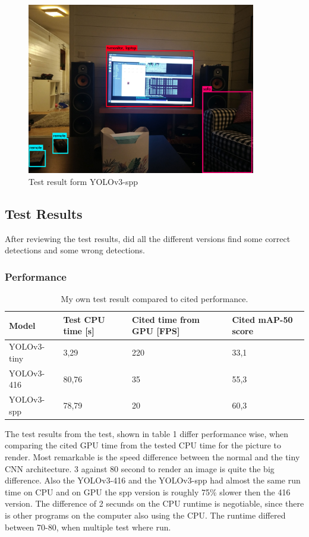 \begin{figure}
    \centering
        \includegraphics[width=10cm]{experiment_files/yolov3-spp.jpg}
    \caption{Test result form YOLOv3-spp}
    \label{fig:YOLOv3_spp}
\end{figure}

\subsection{Test Results}
After reviewing the test results, did all the different versions find some correct detections and some wrong detections.

\subsubsection*{Performance}
\begin{table}[]
\begin{tabular}{l|lll}
Model       & Test CPU time {[}s{]} & Cited time from GPU {[}FPS{]} & Cited mAP-50 score \cite{yolo_res} \\ \hline
YOLOv3-tiny & 3,29                  & 220                           & 33,1               \\
YOLOv3-416  & 80,76                 & 35                            & 55,3               \\
YOLOv3-spp  & 78,79                 & 20                            & 60,3              
\end{tabular}
\caption{My own test result compared to cited performance.}
\end{table}

The test results from the test, shown in table 1 differ performance wise, when comparing the cited GPU time from the tested CPU time for the picture to render. Most remarkable is the speed difference between the normal and the tiny CNN architecture. 3 against 80 second to render an image is quite the big difference. Also the YOLOv3-416 and the YOLOv3-spp had almost the same run time on CPU and on GPU the spp version is roughly 75\% slower then the 416 version. The difference of 2 secunds on the CPU runtime is negotiable, since there is other programs on the computer also using the CPU. The runtime differed between 70-80, when multiple test where run.


